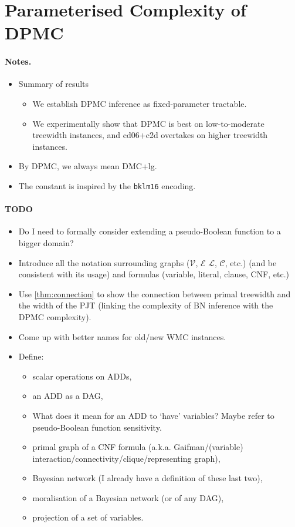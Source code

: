 \documentclass{article}
\theoremstyle{definition}
\theoremstyle{remark}
\begin{document}
\section{Parameterised Complexity of \textsc{DPMC}}

\paragraph{Notes.}
\begin{itemize}
\item Summary of results
  \begin{itemize}
  \item We establish \textsc{DPMC} inference as fixed-parameter tractable.
  \item We experimentally show that \textsc{DPMC} is best on low-to-moderate
    treewidth instances, and cd06+c2d overtakes on higher treewidth instances.
  \end{itemize}
\item By \textsc{DPMC}, we always mean DMC+lg.
\item The constant is inspired by the \texttt{bklm16} encoding.
\end{itemize}

\paragraph{TODO}
\begin{itemize}
\item Do I need to formally consider extending a pseudo-Boolean function to a
  bigger domain?
\item Introduce all the notation surrounding graphs ($\mathcal{V}$,
  $\mathcal{E}$ $\mathcal{L}$, $\mathcal{C}$, etc.) (and be consistent with its
  usage) and formulas (variable, literal, clause, CNF, etc.)
\item Use \cref{thm:connection} to show the connection between primal treewidth
  and the width of the PJT (linking the complexity of BN inference with the DPMC
  complexity).
\item Come up with better names for old/new WMC instances.
\item Define:
  \begin{itemize}
  \item scalar operations on ADDs,
  \item an ADD as a DAG,
  \item What does it mean for an ADD to `have' variables? Maybe refer to
    pseudo-Boolean function sensitivity.
  \item primal graph of a CNF formula (a.k.a.
    Gaifman/(variable) interaction/connectivity/clique/representing graph),
  \item Bayesian network (I already have a definition of these last two),
  \item moralisation of a Bayesian network (or of any DAG),
  \item projection of a set of variables.
  \end{itemize}
\end{itemize}
\end{document}
